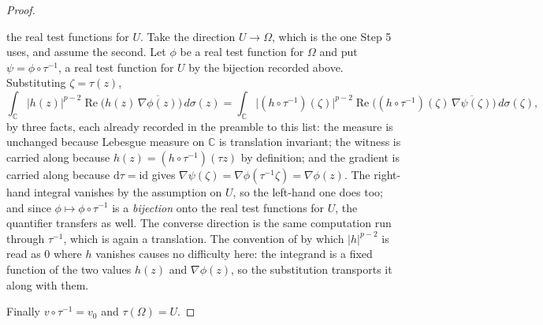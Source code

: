 \begin{proof}
\begin{itemize}
  the real test functions for $U$.  Take the direction $U\to\Omega$, which is
  the one Step 5 uses, and assume the second.  Let $\phi$ be a real test
  function for $\Omega$ and put $\psi=\phi\circ\tau^{-1}$, a real test function
  for $U$ by the bijection recorded above.  Substituting $\zeta=\tau(z)$,
  \[
    \int_{\mathbb{C}}|h(z)|^{p-2}
      \operatorname{Re}\bigl(h(z)\,\overline{\nabla\phi(z)}\bigr)\,d\sigma(z)
    =\int_{\mathbb{C}}\bigl|(h\circ\tau^{-1})(\zeta)\bigr|^{p-2}
      \operatorname{Re}\bigl((h\circ\tau^{-1})(\zeta)\,
        \overline{\nabla\psi(\zeta)}\bigr)\,d\sigma(\zeta),
  \]
  by three facts, each already recorded in the preamble to this list: the
  measure is unchanged because Lebesgue measure on $\mathbb{C}$ is translation
  invariant; the witness is carried along because
  $h(z)=(h\circ\tau^{-1})(\tau z)$ by definition; and the gradient is carried
  along because $\mathrm{d}\tau=\mathrm{id}$ gives
  $\nabla\psi(\zeta)=\nabla\phi(\tau^{-1}\zeta)=\nabla\phi(z)$.  The right-hand
  integral vanishes by the assumption on $U$, so the left-hand one does too;
  and since $\phi\mapsto\phi\circ\tau^{-1}$ is a \emph{bijection} onto the real
  test functions for $U$, the quantifier transfers as well.  The converse
  direction is the same computation run through $\tau^{-1}$, which is again a
  translation.  The convention of  by which $|h|^{p-2}$ is
  read as $0$ where $h$ vanishes causes no difficulty here: the integrand is a
  fixed function of the two values $h(z)$ and $\nabla\phi(z)$, so the
  substitution transports it along with them.
\end{itemize}
Finally $v\circ\tau^{-1}=v_0$ and $\tau(\Omega)=U$.


\end{proof}

